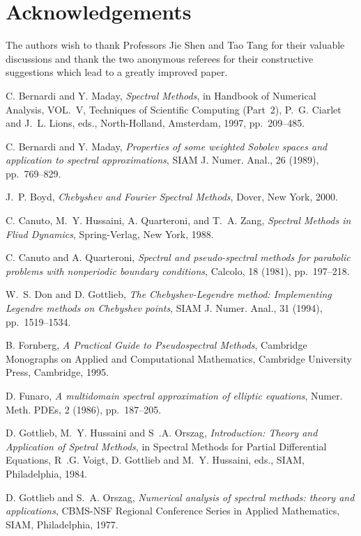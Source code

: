 \documentclass[article]{siamltex}
\begin{document}
 \section*{Acknowledgements} The authors wish to thank Professors
Jie Shen and Tao Tang for their valuable discussions and thank the
two anonymous referees for their constructive suggestions which
lead to a greatly improved paper.


\begin{thebibliography}{10}
 {\sc C. Bernardi and Y. Maday}, {\em
Spectral Methods}, in Handbook of Numerical Analysis, VOL.~V,
Techniques of Scientific Computing (Part~2), P.~G. Ciarlet and
J.~L. Lions, eds., North-Holland, Amsterdam, 1997, pp.~209--485.

 {\sc C. Bernardi and Y. Maday}, {\em
Properties of some weighted Sobolev spaces and application to
spectral approximations}, SIAM J. Numer. Anal., 26 (1989),
pp.~769--829.

 {\sc J.~P. Boyd}, {\em Chebyshev and Fourier
Spectral Methods}, Dover, New York, 2000.

 {\sc C. Canuto, M.~Y. Hussaini, A.
Quarteroni, and T.~A. Zang}, {\em Spectral Methods in Fliud
Dynamics}, Spring-Verlag, New York, 1988.

 {\sc C. Canuto and A. Quarteroni}, {\em
Spectral and pseudo-spectral methods for parabolic problems with
nonperiodic boundary conditions}, Calcolo, 18 (1981),
pp.~197--218.

 {\sc W.~S. Don and D. Gottlieb}, {\em The
Chebyshev-Legendre method: Implementing Legendre methods on
Chebyshev points}, SIAM J. Numer. Anal., 31 (1994),
pp.~1519--1534.

 {\sc B. Fornberg}, {\em A Practical Guide
to Pseudospectral Methods}, Cambridge Monographs on Applied and
Computational Mathematics, Cambridge University Press, Cambridge,
1995.

 {\sc D. Funaro}, {\em A multidomain spectral
approximation of elliptic equations}, Numer. Meth. PDEs, 2 (1986),
pp.~187--205.

 {\sc D. Gottlieb, M.~Y. Hussaini and S~.A.
Orszag}, {\em Introduction: Theory and Application of Spetral
Methods}, in Spectral Methods for Partial Differential Equations,
R~.G. Voigt, D. Gottlieb and M.~Y. Hussaini, eds., SIAM,
Philadelphia, 1984.

 {\sc D. Gottlieb and S.~A. Orszag}, {\em
Numerical analysis of spectral methods: theory and applications},
CBMS-NSF Regional Conference Series in Applied Mathematics, SIAM,
Philadelphia, 1977.


\end{thebibliography}
\end{document}
